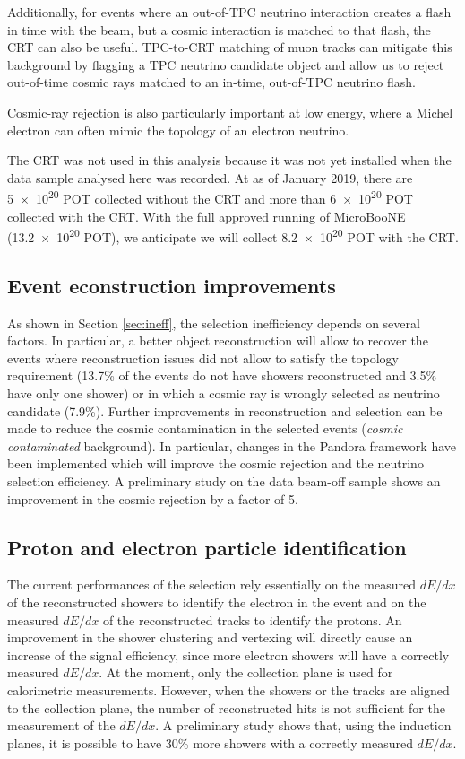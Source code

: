 Additionally, for events where an out-of-TPC neutrino interaction creates a flash in time with the beam, but a cosmic interaction is matched to that flash, the CRT can also be useful.  TPC-to-CRT matching of muon tracks can mitigate this background by flagging a TPC neutrino candidate object and allow us to reject out-of-time cosmic rays matched to an in-time, out-of-TPC neutrino flash.

Cosmic-ray rejection is also particularly important at low energy, where a Michel electron can often mimic the topology of an electron neutrino. 

The CRT was not used in this analysis because it was not yet installed when the data sample analysed here was recorded. At as of January 2019, there are \num{5e20} POT collected without the CRT and more than \num{6e20} POT collected with the CRT. With the full approved running of MicroBooNE (\num{13.2e20} POT), we anticipate we will collect \num{8.2e20} POT with the CRT.

\subsection*{Event econstruction improvements}
As shown in Section \ref{sec:ineff}, the selection inefficiency depends on several factors. In particular, a better object reconstruction will allow to recover the events where reconstruction issues did not allow to satisfy the topology requirement (13.7\% of the events do not have showers reconstructed and 3.5\% have only one shower) or in which a cosmic ray is wrongly selected as neutrino candidate (7.9\%). 
Further improvements in reconstruction and selection can be made to reduce the cosmic contamination in the selected events (\emph{cosmic contaminated} background).
In particular, changes in the Pandora framework have been implemented which will improve the cosmic rejection and the neutrino selection efficiency. A preliminary study on the data beam-off sample shows an improvement in the cosmic rejection by a factor of 5.

\subsection*{Proton and electron particle identification}
The current performances of the selection rely essentially on the measured $dE/dx$ of the reconstructed showers to identify the electron in the event and on the measured $dE/dx$ of the reconstructed tracks to identify the protons. An improvement in the shower clustering and vertexing will directly cause an increase of the signal efficiency, since more electron showers will have a correctly measured $dE/dx$. 
At the moment, only the collection plane is used for calorimetric measurements. However, when the showers or the tracks are aligned to the collection plane, the number of reconstructed hits is not sufficient for the measurement of the $dE/dx$. A preliminary study shows that, using the induction planes, it is possible to have 30\% more showers with a correctly measured $dE/dx$.

